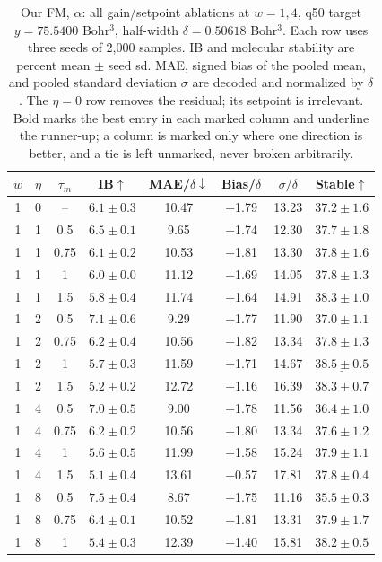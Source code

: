 \documentclass{article}
\begin{document}
\begin{table}[!htbp]
\centering\small
\caption{Our FM, $\alpha$: all gain/setpoint ablations at $w=1,4$, q50 target $y=75.5400$ Bohr$^3$, half-width $\delta=0.50618$ Bohr$^3$. Each row uses three seeds of 2,000 samples. IB and molecular stability are percent mean $\pm$ seed sd. MAE, signed bias of the pooled mean, and pooled standard deviation $\sigma$ are decoded and normalized by $\delta$. The $\eta=0$ row removes the residual; its setpoint is irrelevant. Bold marks the best entry in each marked column and underline the runner-up; a column is marked only where one direction is better, and a tie is left unmarked, never broken arbitrarily.}
\label{tab:grid-fm-alpha}
\begin{tabular}{cccccccc}
\toprule
$w$ & $\eta$ & $\tau_m$ & IB$\uparrow$ & MAE/$\delta\downarrow$ & Bias/$\delta$ & $\sigma/\delta$ & Stable$\uparrow$\\
\midrule
1 & 0 & -- & $6.1\pm0.3$ & 10.47 & +1.79 & 13.23 & $37.2\pm1.6$\\
1 & 1 & 0.5 & $6.5\pm0.1$ & 9.65 & +1.74 & 12.30 & $37.7\pm1.8$\\
1 & 1 & 0.75 & $6.1\pm0.2$ & 10.53 & +1.81 & 13.30 & $37.8\pm1.6$\\
1 & 1 & 1 & $6.0\pm0.0$ & 11.12 & +1.69 & 14.05 & $37.8\pm1.3$\\
1 & 1 & 1.5 & $5.8\pm0.4$ & 11.74 & +1.64 & 14.91 & $38.3\pm1.0$\\
1 & 2 & 0.5 & $7.1\pm0.6$ & 9.29 & +1.77 & 11.90 & $37.0\pm1.1$\\
1 & 2 & 0.75 & $6.2\pm0.4$ & 10.56 & +1.82 & 13.34 & $37.8\pm1.3$\\
1 & 2 & 1 & $5.7\pm0.3$ & 11.59 & +1.71 & 14.67 & $\underline{38.5\pm0.5}$\\
1 & 2 & 1.5 & $5.2\pm0.2$ & 12.72 & +1.16 & 16.39 & $38.3\pm0.7$\\
1 & 4 & 0.5 & $7.0\pm0.5$ & 9.00 & +1.78 & 11.56 & $36.4\pm1.0$\\
1 & 4 & 0.75 & $6.2\pm0.2$ & 10.56 & +1.80 & 13.34 & $37.6\pm1.2$\\
1 & 4 & 1 & $5.6\pm0.5$ & 11.99 & +1.58 & 15.24 & $37.9\pm1.1$\\
1 & 4 & 1.5 & $5.1\pm0.4$ & 13.61 & +0.57 & 17.81 & $37.8\pm0.4$\\
1 & 8 & 0.5 & $7.5\pm0.4$ & 8.67 & +1.75 & 11.16 & $35.5\pm0.3$\\
1 & 8 & 0.75 & $6.4\pm0.1$ & 10.52 & +1.81 & 13.31 & $37.9\pm1.7$\\
1 & 8 & 1 & $5.4\pm0.3$ & 12.39 & +1.40 & 15.81 & $38.2\pm0.5$\\

\end{tabular}
\end{table}
\end{document}
